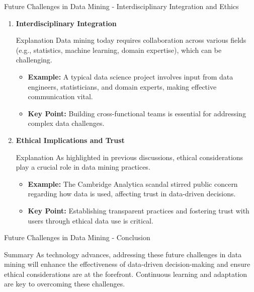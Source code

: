 \documentclass[aspectratio=169]{beamer}
\begin{document}
\begin{frame}[fragile]{Future Challenges in Data Mining - Interdisciplinary Integration and Ethics}
    \begin{enumerate}
        \item \textbf{Interdisciplinary Integration}
        \begin{block}{Explanation}
            Data mining today requires collaboration across various fields (e.g., statistics, machine learning, domain expertise), which can be challenging.
        \end{block}
        \begin{itemize}
            \item \textbf{Example:} A typical data science project involves input from data engineers, statisticians, and domain experts, making effective communication vital.
            \item \textbf{Key Point:} Building cross-functional teams is essential for addressing complex data challenges.
        \end{itemize}

        \item \textbf{Ethical Implications and Trust}
        \begin{block}{Explanation}
            As highlighted in previous discussions, ethical considerations play a crucial role in data mining practices.
        \end{block}
        \begin{itemize}
            \item \textbf{Example:} The Cambridge Analytica scandal stirred public concern regarding how data is used, affecting trust in data-driven decisions.
            \item \textbf{Key Point:} Establishing transparent practices and fostering trust with users through ethical data use is critical.
        \end{itemize}
    \end{enumerate}
\end{frame}

\begin{frame}[fragile]{Future Challenges in Data Mining - Conclusion}
    \begin{block}{Summary}
        As technology advances, addressing these future challenges in data mining will enhance the effectiveness of data-driven decision-making and ensure ethical considerations are at the forefront. Continuous learning and adaptation are key to overcoming these challenges.
    \end{block}
\end{frame}
\end{document}
